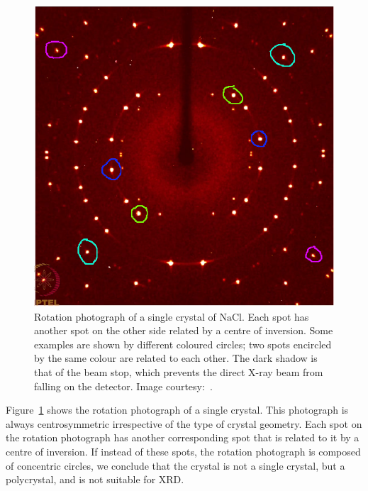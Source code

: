 	\begin{figure}
	\centering
	\includegraphics[scale=0.3]{rotation_photograph_mod.png}
	\caption{\label{fig:rotation_photo}Rotation photograph of a single crystal of $\mathrm{NaCl}$. Each spot has another spot on the other side related by a centre of inversion. Some examples are shown by different coloured circles; two spots encircled by the same colour are related to each other. The dark shadow is that of the beam stop, which prevents the direct X-ray beam from falling on the detector. Image courtesy:~\cite{Chowdhury2022}.}
	\end{figure}
	
	Figure~\ref{fig:rotation_photo} shows the rotation photograph of a single crystal. This photograph is always centrosymmetric irrespective of the type of crystal geometry. Each spot on the rotation photograph has another corresponding spot that is related to it by a centre of inversion. If instead of these spots, the rotation photograph is composed of concentric circles, we conclude that the crystal is not a single crystal, but a polycrystal, and is not suitable for XRD.
